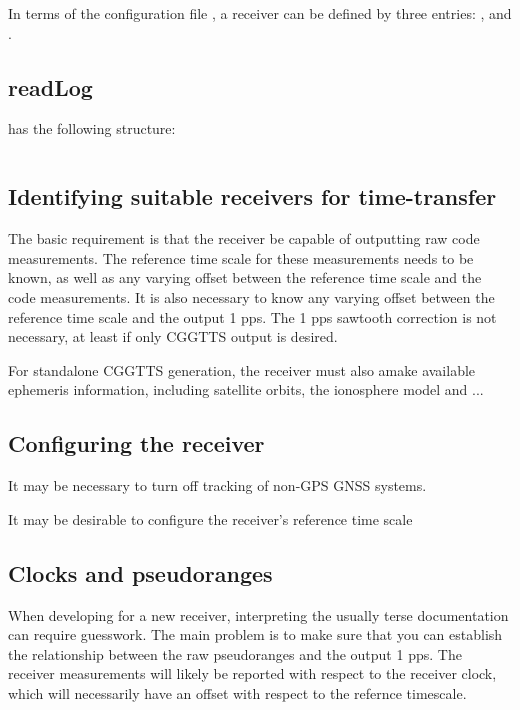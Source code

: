 In terms of the configuration file , a receiver can be defined by three entries:
,  and .

\subsection{readLog}

 has the following structure:
\begin{lstlisting}

\end{lstlisting}

\subsection{Identifying suitable receivers for time-transfer}

The basic requirement is that the receiver be capable of outputting raw code measurements.
The reference time scale for these measurements needs to be known, as well as any varying offset between
the reference time scale and the code measurements. It is also necessary to know any varying offset
between the reference time scale and the output 1 pps. The 1 pps sawtooth correction is not necessary,
at least if only CGGTTS output is desired.

For standalone CGGTTS generation, the receiver must also amake available ephemeris information, including
satellite orbits, the ionosphere model and ...


\subsection{Configuring the receiver}

It may be necessary to turn off tracking of non-GPS GNSS systems.

It may be desirable to configure the receiver's reference time scale 
\subsection{Clocks and pseudoranges}

When developing for a new receiver, interpreting the usually terse documentation can require
guesswork. The main problem is to make sure that you can establish the relationship between the raw 
pseudoranges and the output 1 pps. The receiver measurements will likely be reported with respect to the 
receiver clock, which will necessarily have an offset with respect to the refernce timescale.


